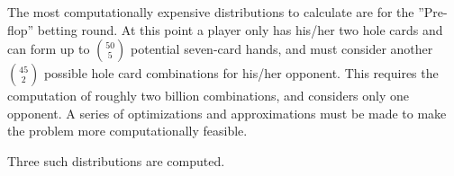 The most computationally expensive distributions to calculate are for the ''Pre-flop'' betting round.
At this point a player only has his/her two hole cards and can form up to $\binom{50}{5}$ potential seven-card hands, and must consider another $\binom{45}{2}$ possible hole card combinations for his/her opponent.
This requires the computation of roughly two billion combinations, and considers only one opponent.
A series of optimizations and approximations must be made to make the problem more computationally feasible. %





Three such distributions are computed.

\clearpage
